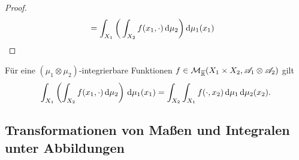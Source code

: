 \begin{satz}
\begin{proof}
\begin{align*}
& = \int_{X_1} \bigg(\int_{X_2}f(x_1,\cdot)\, \mathrm{d} \mu_2 \bigg)\, \mathrm{d}\mu_1(x_1) \qedhere
\end{align*}
 \end{proof}
\end{satz}

\begin{korollar}
\begin{mdframed}
Für eine $(\mu_1\otimes \mu_2)$-integrierbare Funktionen $f\in\mathcal{M}_{\overline{\mathbb{R}}}(X_1\times X_2,\mathscr{A}_1\otimes \mathscr{A}_2)$ gilt
\begin{equation}
\int_{X_1}\left(\int_{X_2}f(x_1,\cdot)\, \mathrm{d}\mu_2\right)\, \mathrm{d}\mu_1(x_1) =\int_{X_2}\int_{X_1}f(\cdot, x_2)\, \mathrm{d}\mu_1 \, \mathrm{d}\mu_2(x_2).
\end{equation}
\end{mdframed}
\end{korollar}

\subsection{Transformationen von Maßen und Integralen unter Abbildungen}
